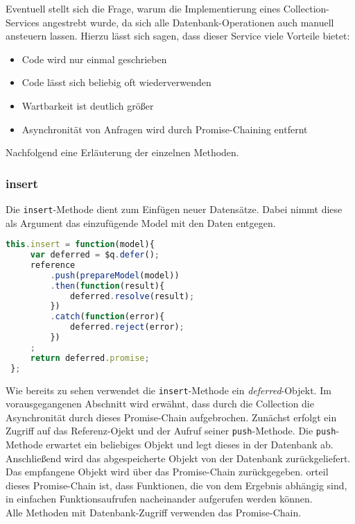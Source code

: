 Eventuell stellt sich die Frage, warum die Implementierung eines Collection-Services angestrebt wurde, da sich alle Datenbank-Operationen auch manuell ansteuern lassen. Hierzu lässt sich
sagen, dass dieser Service viele Vorteile bietet:
\begin{itemize}
\item{Code wird nur einmal geschrieben}
\item{Code lässt sich beliebig oft wiederverwenden}
\item{Wartbarkeit ist deutlich größer}
\item{Asynchronität von Anfragen wird durch Promise-Chaining entfernt}
\end{itemize}

Nachfolgend eine Erläuterung der einzelnen Methoden.

\subsubsection{insert}
Die \texttt{insert}-Methode dient zum Einfügen neuer Datensätze. Dabei nimmt diese als Argument das einzufügende Model mit den Daten entgegen.
 \begin{lstlisting}[language=Javascript, label=code_CollectionInsert, caption=Insert-Methode einer Collection]
 this.insert = function(model){
     var deferred = $q.defer();
     reference
         .push(prepareModel(model))
         .then(function(result){
             deferred.resolve(result);
         })
         .catch(function(error){
             deferred.reject(error);
         })
     ;
     return deferred.promise;
 };
 \end{lstlisting}

 Wie bereits zu sehen verwendet die \texttt{insert}-Methode ein \textit{deferred}-Objekt. Im vorausgegangenen Abschnitt wird erwähnt, dass durch die Collection die Asynchronität durch dieses
 Promise-Chain aufgebrochen. Zunächst erfolgt ein Zugriff auf das Referenz-Ojekt und der Aufruf seiner \texttt{push}-Methode. Die \texttt{push}-Methode erwartet ein beliebiges Objekt
 und legt dieses in der Datenbank ab. Anschließend wird das abgespeicherte Objekt von der Datenbank zurückgeliefert.
 Das empfangene Objekt wird über das Promise-Chain zurückgegeben.
 orteil dieses Promise-Chain ist, dass Funktionen, die von dem Ergebnis abhängig sind, in einfachen Funktionsaufrufen nacheinander aufgerufen werden können.\\
 Alle Methoden mit Datenbank-Zugriff verwenden das Promise-Chain.

